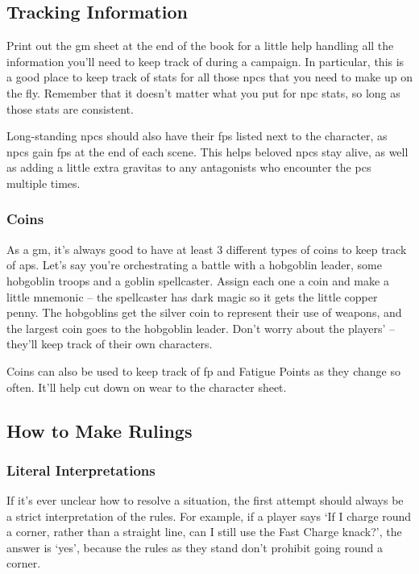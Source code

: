 \begin{multicols}{2}
\subsection{Tracking Information}

Print out the \gls{gm} sheet at the end of the book for a little help handling all the information you'll need to keep track of during a campaign.
In particular, this is a good place to keep track of stats for all those \glspl{npc} that you need to make up on the fly.
Remember that it doesn't matter what you put for \gls{npc} stats, so long as those stats are consistent.

Long-standing \glspl{npc} should also have their \glspl{fp} listed next to the character, as \glspl{npc} gain \glspl{fp} at the end of each scene.
This helps beloved \glspl{npc} stay alive, as well as adding a little extra gravitas to any antagonists who encounter the \glspl{pc} multiple times.

\subsubsection{Coins}

As a \gls{gm}, it's always good to have at least 3 different types of coins to keep track of \glspl{ap}.
Let's say you're orchestrating a battle with a hobgoblin leader, some hobgoblin troops and a goblin spellcaster.
Assign each one a coin and make a little mnemonic -- the spellcaster has dark magic so it gets the little copper penny.
The hobgoblins get the silver coin to represent their use of weapons, and the largest coin goes to the hobgoblin leader.
Don't worry about the players'  -- they'll keep track of their own characters.

Coins can also be used to keep track of \gls{fp} and Fatigue Points as they change so often.
It'll help cut down on wear to the character sheet.

\subsection{How to Make Rulings}

\subsubsection{Literal Interpretations}

If it's ever unclear how to resolve a situation, the first attempt should always be a strict interpretation of the rules.
For example, if a player says `If I charge round a corner, rather than a straight line, can I still use the Fast Charge knack?', the answer is `yes', because the rules as they stand don't prohibit going round a corner.


\end{multicols}
